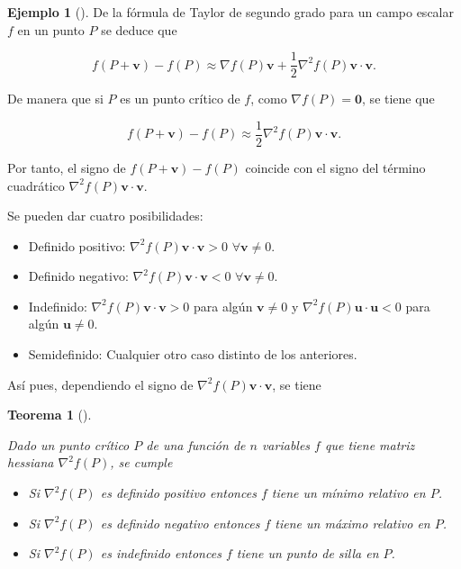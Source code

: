 \documentclass[
  a4paper,
]{scrreport}
\providecommand{\tightlist}{%
  \setlength{\itemsep}{0pt}\setlength{\parskip}{0pt}}\usepackage{longtable,booktabs,array}
\theoremstyle{definition}
\newtheorem{example}{Ejemplo}[chapter]
\theoremstyle{plain}
\theoremstyle{definition}
\theoremstyle{definition}
\theoremstyle{plain}
\newtheorem{theorem}{Teorema}[chapter]
\theoremstyle{plain}
\theoremstyle{remark}
\begin{document}
\begin{example}[]
De la fórmula de Taylor de segundo grado para un campo escalar \(f\) en
un punto \(P\) se deduce que

\[
f(P+\mathbf{v})-f(P)\approx \nabla f(P)\mathbf{v}+\frac{1}{2}\nabla^2f(P)\mathbf{v}\cdot\mathbf{v}.
\]

De manera que si \(P\) es un punto crítico de \(f\), como
\(\nabla f(P)=\mathbf{0}\), se tiene que

\[
f(P+\mathbf{v})-f(P)\approx \frac{1}{2}\nabla^2f(P)\mathbf{v}\cdot\mathbf{v}.
\]

Por tanto, el signo de \(f(P+\mathbf{v})-f(P)\) coincide con el signo
del término cuadrático \(\nabla^2f(P)\mathbf{v}\cdot\mathbf{v}\).

Se pueden dar cuatro posibilidades:

\begin{itemize}
\tightlist
\item
  Definido positivo: \(\nabla^2f(P)\mathbf{v}\cdot\mathbf{v}>0\)
  \(\forall \mathbf{v}\neq 0\).
\item
  Definido negativo: \(\nabla^2f(P)\mathbf{v}\cdot\mathbf{v}<0\)
  \(\forall \mathbf{v}\neq 0\).
\item
  Indefinido: \(\nabla^2f(P)\mathbf{v}\cdot\mathbf{v}>0\) para algún
  \(\mathbf{v}\neq 0\) y \(\nabla^2f(P)\mathbf{u}\cdot\mathbf{u}<0\)
  para algún \(\mathbf{u}\neq 0\).
\item
  Semidefinido: Cualquier otro caso distinto de los anteriores.
\end{itemize}

Así pues, dependiendo el signo de
\(\nabla^2f(P)\mathbf{v}\cdot\mathbf{v}\), se tiene

\begin{theorem}[]\protect\hypertarget{thm-extremos-funcion-varias-variables}{}\label{thm-extremos-funcion-varias-variables}

Dado un punto crítico \(P\) de una función de \(n\) variables \(f\) que
tiene matriz hessiana \(\nabla^2 f(P)\), se cumple

\begin{itemize}
\tightlist
\item
  Si \(\nabla^2f(P)\) es definido positivo entonces \(f\) tiene un
  \emph{mínimo relativo} en \(P\).
\item
  Si \(\nabla^2f(P)\) es definido negativo entonces \(f\) tiene un
  \emph{máximo relativo} en \(P\).
\item
  Si \(\nabla^2f(P)\) es indefinido entonces \(f\) tiene un \emph{punto
  de silla} en \(P\).
\end{itemize}


\end{theorem}
\end{example}
\end{document}
